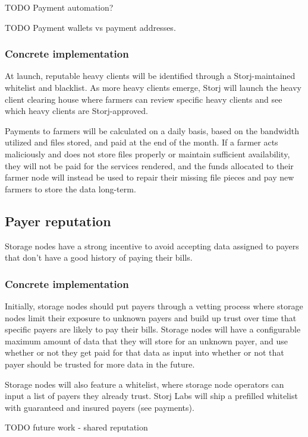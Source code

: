 \documentclass[a4paper,10pt]{article} \usepackage[utf8]{inputenc}
\newcommand{\todo}[1]{{\color{red} TODO #1 }}
\begin{document}
\todo{Payment automation?}

\todo{Payment wallets vs payment addresses. }


\subsubsection{Concrete implementation}
At launch, reputable heavy clients will be identified through a
Storj-maintained whitelist and blacklist. As more heavy clients emerge, Storj
will launch the heavy client clearing house where farmers can review specific
heavy clients and see which heavy clients are Storj-approved.

Payments to farmers will be calculated on a daily basis, based on the bandwidth
utilized and files stored, and paid at the end of the month. If a farmer acts
maliciously and does not store files properly or maintain sufficient
availability, they will not be paid for the services rendered, and the funds
allocated to their farmer node will instead be used to repair their missing
file pieces and pay new farmers to store the data long-term.

\subsection{Payer reputation}

Storage nodes have a strong incentive to avoid accepting data assigned to payers
that don't have a good history of paying their bills.

\subsubsection{Concrete implementation}

Initially, storage nodes should put payers through a vetting process
where storage nodes limit their exposure to unknown payers and build up trust
over time that specific payers are likely to pay their bills. Storage nodes
will have a configurable maximum amount of data that they will store for an
unknown payer, and use whether or not they get paid for that data as input into
whether or not that payer should be trusted for more data in the future.

Storage nodes will also feature a whitelist, where storage node operators can
input a list of payers they already trust. Storj Labs will ship a prefilled
whitelist with guaranteed and insured payers (see payments).

\todo{future work - shared reputation}
\end{document}
